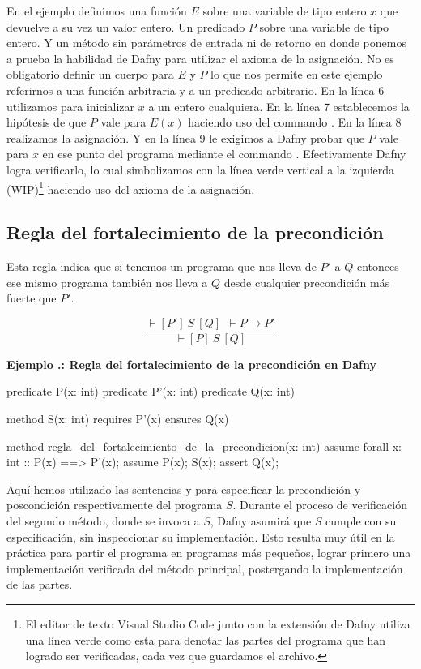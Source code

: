 \documentclass[12pt, a4paper, openany, fleqn]{book}
\newcounter{example}[chapter]
\renewcommand{\theexample}{\thechapter.\arabic{example}}
\newcommand{\example}[1]{
  \refstepcounter{example} %
  \vspace{1em}
  \noindent\textbf{Ejemplo \theexample: #1}
}
\newcommand{\hoareTheorem}[3]{\ensuremath{\vdash[#1]\ #2\ [#3]}}
\newcommand{\inferenceRule}[2]{
    \begin{equation*}
        \frac{#1}{#2}
    \end{equation*}
}
\begin{document}
    En el ejemplo definimos una función $E$ sobre una variable de tipo entero $x$ que devuelve a su vez un valor entero.
    Un predicado $P$ sobre una variable de tipo entero.
    Y un método sin parámetros de entrada ni de retorno en donde ponemos a prueba la habilidad de Dafny para utilizar el axioma de la asignación.
    No es obligatorio definir un cuerpo para $E$ y $P$ lo que nos permite en este ejemplo referirnos a una función arbitraria y a un predicado arbitrario.
    En la línea 6 utilizamos  para inicializar $x$ a un entero cualquiera.
    En la línea 7 establecemos la hipótesis de que $P$ vale para $E(x)$ haciendo uso del commando .
    En la línea 8 realizamos la asignación.
    Y en la línea 9 le exigimos a Dafny probar que $P$ vale para $x$ en ese punto del programa mediante el commando .
    Efectivamente Dafny logra verificarlo, lo cual simbolizamos con la línea verde vertical a la izquierda (WIP)\footnote{El editor de texto Visual Studio Code junto con la extensión de Dafny utiliza una línea verde como esta para denotar las partes del programa que han logrado ser verificadas, cada vez que guardamos el archivo.} haciendo uso del axioma de la asignación. 
    \vspace{1em}

    \subsection{Regla del fortalecimiento de la precondición}
    Esta regla indica que si tenemos un programa que nos lleva de $P'$ a $Q$ entonces ese mismo programa también nos lleva a $Q$ desde cualquier precondición más fuerte que $P'$.
    \inferenceRule{\hoareTheorem{P'}{S}{Q}\ \ \vdash P \rightarrow P'}{\hoareTheorem{P}{S}{Q}}

    \example{Regla del fortalecimiento de la precondición en Dafny}
    \begin{dafny}
        
predicate P(x: int)
predicate P'(x: int)
predicate Q(x: int)

method S(x: int)
    requires P'(x)
    ensures Q(x)

method regla_del_fortalecimiento_de_la_precondicion(x: int)
{
    assume forall x: int :: P(x) ==> P'(x);
    assume P(x);
    S(x);
    assert Q(x); 
}
    \end{dafny}

    Aquí hemos utilizado las sentencias  y  para especificar la precondición y poscondición respectivamente del programa $S$. Durante el proceso de verificación del segundo método, donde se invoca a $S$, Dafny asumirá que $S$ cumple con su especificación, sin inspeccionar su implementación. Esto resulta muy útil en la práctica para partir el programa en programas más pequeños, lograr primero una implementación verificada del método principal, postergando la implementación de las partes.
\end{document}
